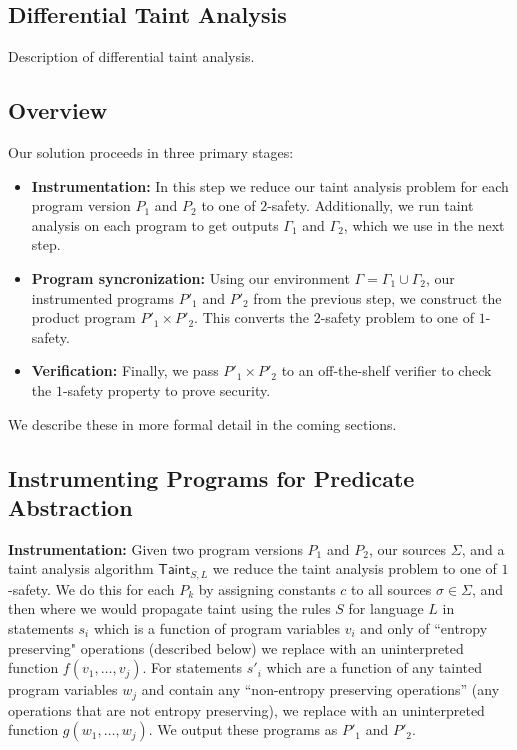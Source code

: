 \documentclass[letterpaper,twocolumn,10pt]{article}
\begin{document}
\subsection{Differential Taint Analysis}

Description of differential taint analysis.

\subsection{Overview}

Our solution proceeds in three primary stages:

\begin{itemize}
    \item \textbf{Instrumentation:} In this step we reduce our taint analysis problem for each program version $P_1$ and $P_2$ to one of $2$-safety.
    Additionally, we run taint analysis on each program to get outputs $\Gamma_1$ and $\Gamma_2$, which we use in the next step.
    \item \textbf{Program syncronization:} Using our environment $\Gamma = \Gamma_1 \cup \Gamma_2$, our instrumented programs $P'_1$ and $P'_2$ from 
    the previous step, we construct the product program $P'_1 \times P'_2$. This converts the $2$-safety problem to one of $1$-safety.
    \item \textbf{Verification:} Finally, we pass $P'_1 \times P'_2$ to an off-the-shelf verifier to check the $1$-safety property to
    prove security.
\end{itemize}

We describe these in more formal detail in the coming sections.

\subsection{Instrumenting Programs for Predicate Abstraction}

\textbf{Instrumentation:} Given two program versions $P_1$ and $P_2$, our sources $\Sigma$, and a taint analysis algorithm $\mathsf{Taint}_{S,L}$
     we reduce the taint analysis problem to one of $1$-safety.
    We do this for each $P_k$ by assigning constants $c$ to all sources $\sigma \in \Sigma$, and then where we would propagate taint using the rules $S$ for language $L$
    in statements $s_i$ which is a function of program variables $v_i$ and only of ``entropy preserving" operations (described below) 
    we replace with an uninterpreted function $f(v_1, \ldots, v_j)$. For statements $s'_i$ which are a
    function of any tainted program variables $w_j$ and contain any ``non-entropy preserving operations'' (any operations that are not entropy preserving), we replace
    with an uninterpreted function $g(w_1, \ldots, w_j)$. We output these programs as $P'_1$ and $P'_2$.
\end{document}
